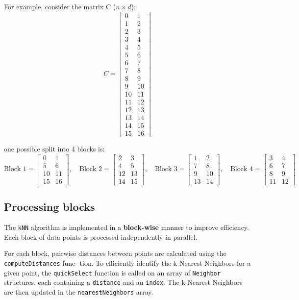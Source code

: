 \documentclass{article}
\begin{document}
For example, consider the matrix C ($n \times d$):
\[
C = \begin{bmatrix}
0 & 1 \\
1 & 2 \\
2 & 3 \\
3 & 4 \\
4 & 5 \\
5 & 6 \\
6 & 7 \\
7 & 8 \\
8 & 9 \\
9 & 10 \\
10 & 11 \\
11 & 12 \\
12 & 13 \\
13 & 14 \\
14 & 15 \\
15 & 16
\end{bmatrix}
\]

one possible split into 4 blocks is:
\[
\text{Block 1} = \begin{bmatrix}
0 & 1 \\
5 & 6 \\
10 & 11 \\
15 & 16
\end{bmatrix}, \quad
\text{Block 2} = \begin{bmatrix}
2 & 3 \\
4 & 5 \\
12 & 13 \\
14 & 15
\end{bmatrix}, \quad
\text{Block 3} = \begin{bmatrix}
1 & 2 \\
7 & 8 \\
9 & 10 \\
13 & 14
\end{bmatrix}, \quad
\text{Block 4} = \begin{bmatrix}
3 & 4 \\
6 & 7 \\
8 & 9 \\
11 & 12
\end{bmatrix}
\]

\subsection{Processing blocks}
The \texttt{kNN} algorithm is implemented in a \textbf{block-wise} manner to improve efficiency. Each block of data
points is processed independently in parallel.

For each block, pairwise distances between points are calculated using the \texttt{computeDistances} func-
tion. To efficiently identify the k-Nearest Neighbors for a given point, the \texttt{quickSelect} function is called
on an array of \texttt{Neighbor} structures, each containing a \texttt{distance} and an \texttt{index}. The k-Nearest Neighbors
are then updated in the \texttt{nearestNeighbors} array.
\end{document}
